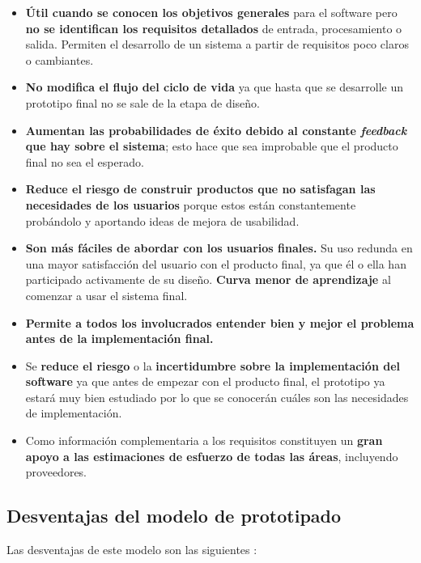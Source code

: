 \begin{itemize}
    \item \textbf{Útil cuando se conocen los objetivos generales} para el software pero \textbf{no se identifican los requisitos detallados} de entrada, procesamiento o salida. Permiten el desarrollo de un sistema a partir de requisitos poco claros o cambiantes.
    \item \textbf{No modifica el flujo del ciclo de vida} ya que hasta que se desarrolle un prototipo final no se sale de la etapa de diseño.
    \item \textbf{Aumentan las probabilidades de éxito debido al constante \textit{feedback} que hay sobre el sistema}; esto hace que sea improbable que el producto final no sea el esperado.
    \item \textbf{Reduce el riesgo de construir productos que no satisfagan las necesidades de los usuarios} porque estos están constantemente probándolo y aportando ideas de mejora de usabilidad.
    \item  \textbf{Son más fáciles de abordar con los usuarios finales.} Su uso redunda en una mayor satisfacción del usuario con el producto final, ya que él o ella han participado activamente de su diseño. \textbf{Curva menor de aprendizaje} al comenzar a usar el sistema final. 
    \item \textbf{Permite a todos los involucrados entender bien y mejor el problema antes de la implementación final.}
    \item Se \textbf{reduce el riesgo} o la \textbf{incertidumbre sobre la implementación del software} ya que antes de empezar con el producto final, el prototipo ya estará muy bien estudiado por lo que se conocerán cuáles son las necesidades de implementación.
    \item Como información complementaria a los requisitos constituyen un \textbf{gran apoyo a las estimaciones de esfuerzo de todas las áreas}, incluyendo proveedores.
\end{itemize}

\subsection{Desventajas del modelo de prototipado}
Las desventajas de este modelo son las siguientes \cite{modeloPrototipos1, modeloPrototipos2, ventajasDesventajasPrototipos}: 

